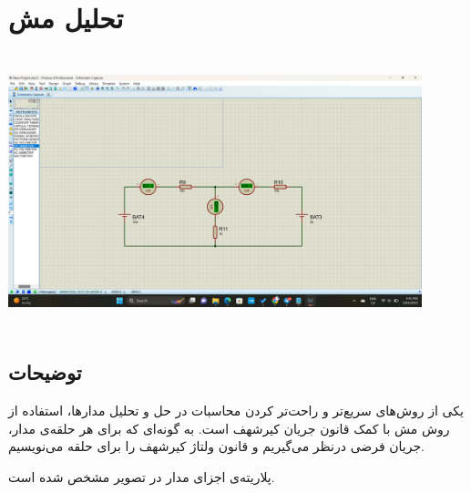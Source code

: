 \documentclass{article}
\begin{document}
	\section{تحلیل مش}
		\begin{center}
			\includegraphics[width=12cm, height=8cm]{./images/3_1}
		\end{center}
		
		\subsection{توضیحات} 
			یکی از روش‌های سریع‌تر و راحت‌تر کردن محاسبات در حل و تحلیل مدار‌ها، استفاده از روش مش با کمک قانون جریان کیرشهف است. به گونه‌ای که برای هر حلقه‌ی مدار، جریان فرضی درنظر می‌گیریم و قانون ولتاژ کیرشهف را برای حلقه می‌نویسیم.
			
			پلاریته‌ی اجزای مدار در تصویر مشخص شده است.
		
\end{document}
